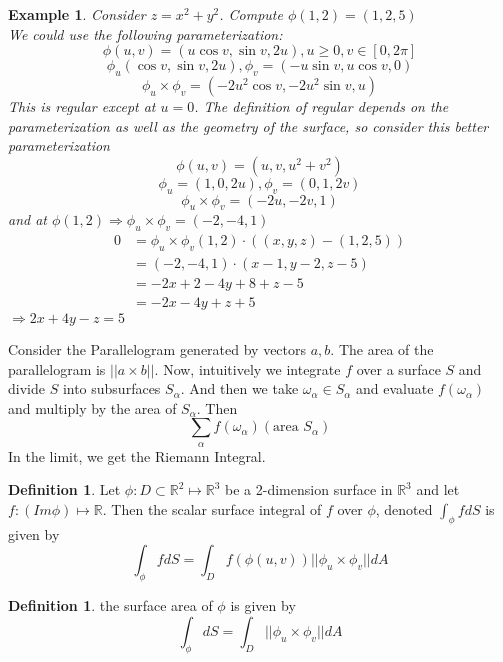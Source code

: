 \documentclass[12pt]{article}
\theoremstyle{plain}
\newtheorem{example}[theorem]{Example}
\theoremstyle{definition}
\newtheorem{definition}[theorem]{Definition}
\begin{document}
\begin{example}
	Consider $z=x^2 + y^2$. Compute $\phi (1,2) = (1,2,5)$\\
	We could use the following parameterization:\\
	$$\phi (u,v) = (u \cos v, \sin v, 2u), u \geq 0, v \in [0,2\pi]$$
	$$\phi_u (\cos v, \sin v, 2u), \phi_v = (-u \sin v, u \cos v, 0)$$
	$$\phi_u \times \phi_v = (-2u^2 \cos v, -2u^2 \sin v, u)$$
	This is regular except at $u=0$. The definition of regular depends on the parameterization as well as the geometry of the surface, so consider this better parameterization\\
	$$\phi (u,v) = (u,v,u^2 + v^2)$$
	$$\phi_u = (1,0,2u), \phi_v = (0,1,2v)$$
	$$\phi_u \times \phi_v = (-2u, -2v, 1)$$
	and at $\phi (1,2) \Longrightarrow \phi_u \times \phi_v = (-2,-4,1)$
	\begin{align*}
		0 &= \phi_u \times \phi_v (1,2) \cdot ((x,y,z) - (1,2,5))\\
		&= (-2,-4,1) \cdot (x-1, y-2, z-5)\\
		&= -2x + 2 - 4y + 8 +z -5\\
		&= -2x -4y + z +5
	\end{align*}
	$\Longrightarrow 2x+4y-z=5$
\end{example}

Consider the Parallelogram generated by vectors $a,b$. The area of the parallelogram is $||a \times b||$. Now, intuitively we integrate $f$ over a surface $S$ and divide $S$ into subsurfaces $S_\alpha$. And then we take $\omega_\alpha \in S_\alpha$ and evaluate $f(\omega_\alpha)$ and multiply by the area of $S_\alpha$. Then $$\sum_\alpha f(\omega_\alpha)(\text{area } S_\alpha)$$
In the limit, we get the Riemann Integral.

\begin{definition}
	Let $\phi : D \subset \mathbb{R}^2 \mapsto \mathbb{R}^3$ be a 2-dimension surface in $\mathbb{R}^3$ and let $f:(Im \phi)\mapsto \mathbb{R}$. Then the scalar surface integral of $f$ over $\phi$, denoted $\int_\phi f dS$ is given by
	$$\int_\phi f dS = \int_D f(\phi (u,v)) ||\phi_u \times \phi_v|| dA$$
\end{definition}

\begin{definition}
	the surface area of $\phi$ is given by
	$$\int_\phi dS = \int_D ||\phi_u \times \phi_v|| dA$$
\end{definition}
\end{document}

